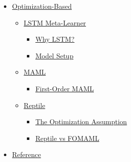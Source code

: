 \begin{itemize}
\begin{itemize}
    \begin{itemize}
    \tightlist
    \item
      \hyperref[mann-for-meta-learning]{MANN for Meta-Learning}
    \item
      \hyperref[addressing-mechanism-for-meta-learning]{Addressing Mechanism for Meta-Learning}
    \end{itemize}
  \item
    \hyperref[meta-networks]{Meta Networks}

    \begin{itemize}
    \tightlist
    \item
      \hyperref[fast-weights]{Fast Weights}
    \item
      \hyperref[model-components]{Model Components}
    \item
      \hyperref[training-process]{Training Process}
    \end{itemize}
  \end{itemize}
\item
  \hyperref[optimization-based]{Optimization-Based}

  \begin{itemize}
  \tightlist
  \item
    \hyperref[lstm-meta-learner]{LSTM Meta-Learner}

    \begin{itemize}
    \tightlist
    \item
      \hyperref[why-lstm]{Why LSTM?}
    \item
      \hyperref[model-setup]{Model Setup}
    \end{itemize}
  \item
    \hyperref[maml]{MAML}

    \begin{itemize}
    \tightlist
    \item
      \hyperref[first-order-maml]{First-Order MAML}
    \end{itemize}
  \item
    \hyperref[reptile]{Reptile}

    \begin{itemize}
    \tightlist
    \item
      \hyperref[the-optimization-assumption]{The Optimization Assumption}
    \item
      \hyperref[reptile-vs-fomaml]{Reptile vs FOMAML}
    \end{itemize}
  \end{itemize}
\item
  \hyperref[reference]{Reference}
\end{itemize}


